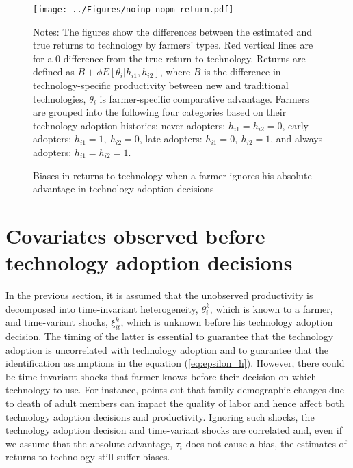 \documentclass[11pt,letterpaper]{article}
\begin{document}
\begin{figure}[H]
  \centering
  \caption{Biases in returns to technology when a farmer ignores his absolute advantage in technology adoption decisions}
  \texttt{[image: ../Figures/noinp\_nopm\_return.pdf]}
  \label{fig:noinp_nopm_return}
  \footnotesize
  \begin{tablenotes}
    \item Notes:
      The figures show the differences between the estimated and true returns to technology by farmers' types.
      Red vertical lines are for a 0 difference from the true return to technology.
      Returns are defined as $B + \phi E[\theta_i | h_{i1}, h_{i2}]$, where $B$ is the difference in technology-specific productivity between new and traditional technologies, $\theta_i$ is farmer-specific comparative advantage.
      Farmers are grouped into the following four categories based on their technology adoption histories:
      never adopters: $h_{i1} = h_{i2} = 0$, 
      early adopters: $h_{i1} = 1, \ h_{i2} = 0$, 
      late adopters: $h_{i1} = 0, \ h_{i2} = 1$, and
      always adopters: $h_{i1} = h_{i2} = 1$.
  \end{tablenotes}
\end{figure}


\section{Covariates observed before technology adoption decisions}\label{sec:covar}

In the previous section, it is assumed that the unobserved productivity is decomposed into time-invariant heterogeneity, $\theta_i^k$, which is known to a farmer, and time-variant shocks, $\xi_{it}^k$, which is unknown before his technology adoption decision.
The timing of the latter is essential to guarantee that the technology adoption is uncorrelated with technology adoption and to guarantee that the identification assumptions in the equation (\ref{eq:epsilon_h}).
However, there could be time-invariant shocks that farmer knows before their decision on which technology to use.
For instance, \citet{Suri11} points out that family demographic changes due to death of adult members can impact the quality of labor and hence affect both technology adoption decisions and productivity.
Ignoring such shocks, the technology adoption decision and time-variant shocks are correlated and, even if we assume that the absolute advantage, $\tau_i$ does not cause a bias, the estimates of returns to technology still suffer biases.
\end{document}
